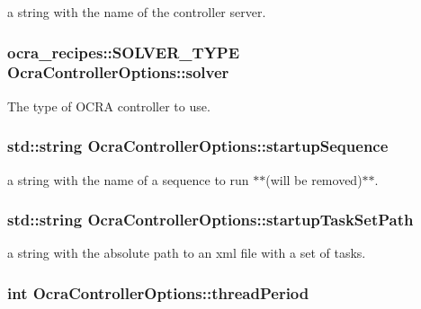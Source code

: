 a string with the name of the controller server. \hypertarget{classOcraControllerOptions_af79b8705c3f3097b642262bc877eaa8e}{
\subsubsection[{solver}]{\setlength{\rightskip}{0pt plus 5cm}ocra\-\_\-recipes\-::\-S\-O\-L\-V\-E\-R\-\_\-\-T\-Y\-P\-E {\bf \-Ocra\-Controller\-Options\-::solver}}}\label{classOcraControllerOptions_af79b8705c3f3097b642262bc877eaa8e}
\-The type of \-O\-C\-R\-A controller to use. \hypertarget{classOcraControllerOptions_ab01efbd786ad8bc5beb6de02dbcd0936}{
\subsubsection[{startup\-Sequence}]{\setlength{\rightskip}{0pt plus 5cm}std\-::string {\bf \-Ocra\-Controller\-Options\-::startup\-Sequence}}}\label{classOcraControllerOptions_ab01efbd786ad8bc5beb6de02dbcd0936}
a string with the name of a sequence to run $\ast$$\ast$(will be removed)$\ast$$\ast$. \hypertarget{classOcraControllerOptions_af91566ecff3f7ed02571369c7af061ce}{
\subsubsection[{startup\-Task\-Set\-Path}]{\setlength{\rightskip}{0pt plus 5cm}std\-::string {\bf \-Ocra\-Controller\-Options\-::startup\-Task\-Set\-Path}}}\label{classOcraControllerOptions_af91566ecff3f7ed02571369c7af061ce}
a string with the absolute path to an xml file with a set of tasks. \hypertarget{classOcraControllerOptions_ab706ae593bf5b30433cfd6f957b51db4}{
\subsubsection[{thread\-Period}]{\setlength{\rightskip}{0pt plus 5cm}int {\bf \-Ocra\-Controller\-Options\-::thread\-Period}}}\label{classOcraControllerOptions_ab706ae593bf5b30433cfd6f957b51db4}
